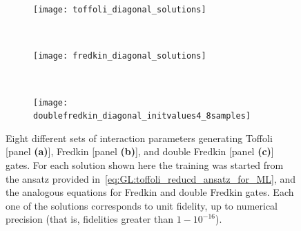 
\begin{figure}[tb]
    \vspace{-50pt}
    \begin{subfigure}{\textwidth}
        \centering
        \caption{}
        \label{fig:GL:toffoli_diagonal_solutions}
        \texttt{[image: toffoli\_diagonal\_solutions]}
    \end{subfigure} \\
    \begin{subfigure}{\textwidth}
        \centering
        \caption{}
        \label{fig:GL:fredkin_diagonal_solutions}
        \texttt{[image: fredkin\_diagonal\_solutions]}
    \end{subfigure} \\
    \begin{subfigure}{\textwidth}
        \centering
        \caption{}
        \label{fig:GL:doublefredkin_diagonal_solutions}
        \texttt{[image: doublefredkin\_diagonal\_initvalues4\_8samples]}
    \end{subfigure}
    \caption{
        Eight different sets of interaction parameters generating Toffoli [panel \textbf{(a)}], Fredkin [panel \textbf{(b)}], and double Fredkin [panel \textbf{(c)}] gates. For each solution shown here the training was started from the ansatz provided in~\cref{eq:GL:toffoli_reducd_ansatz_for_ML}, and the analogous equations for Fredkin and double Fredkin gates.
        Each one of the solutions corresponds to unit fidelity, up to numerical precision (that is, fidelities greater than $1-10^{-16}$).
    }
    \label{fig:GL:toffoli_diagonal_solutions}
\end{figure}

